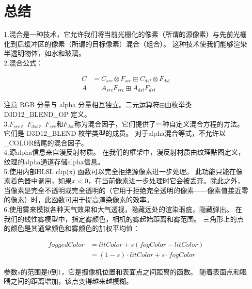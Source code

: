 \section{总结}
\begin{flushleft}
1.混合是一种技术，它允许我们将当前光栅化的像素（所谓的源像素）与先前光栅化到后缓冲区的像素（所谓的目标像素）混合（组合）。 这种技术使我们能够渲染半透明物体，如水和玻璃。\\

2.混合公式：\\
\end{flushleft}
\begin{align*}
C&=C_{src}\otimes F_{src}\boxplus C_{dst}\otimes F_{dst}\\
A&=A_{src}F_{src}\boxplus A_{dst}F_{dst}
\end{align*}
\begin{flushleft}
注意 RGB 分量与 alpha 分量相互独立。二元运算符$\boxplus$由枚举类 D3D12\_BLEND\_OP 定义。\\

3.$F_{src}$，$F_{dst}$，$F_{src}$和$F_{dst}$称为混合因子，它们提供了一种自定义混合方程的方法。它们是 D3D12\_BLEND 枚举类型的成员。 对于alpha混合等式，不允许以\_COLOR结尾的混合因子。\\

4.源alpha信息来自漫反射材质。 在我们的框架中，漫反射材质由纹理贴图定义，纹理的alpha通道存储alpha信息。\\

5.使用内部HLSL clip(x) 函数可以完全拒绝源像素进一步处理。 此功能只能在像素着色器中调用，如果$x<0$，在当前像素进一步处理时它会被丢弃。除此之外，当像素是完全不透明或完全透明的（它用于拒绝完全透明的像素——像素值接近零的像素）时，此函数可用于提高渲染像素的效率。\\

6.使用雾来模拟各种天气效果和大气透视，隐藏远处的渲染瑕疵，隐藏弹出。 在我们的线性雾模型中，指定雾颜色，相机的雾起始距离和雾范围。 三角形上的点的颜色是其通常颜色和雾颜色的加权平均值：\\
\end{flushleft}

\begin{align*}
foggedColor&=litColor+s(fogColor-litColor)\\
&=(1-s)\cdot litColor+s\cdot fogColor
\end{align*}

\begin{flushleft}
参数$s$的范围是$0$到$1$，它是摄像机位置和表面点之间距离的函数。 随着表面点和眼睛之间的距离增加，该点变得越来越模糊。
\end{flushleft}

